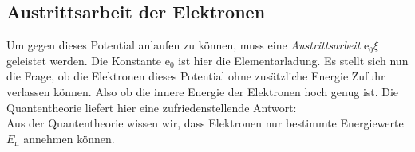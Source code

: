 \subsection{Austrittsarbeit der Elektronen}

Um gegen dieses Potential anlaufen zu können, muss eine
\textit{Austrittsarbeit} $\mathrm{e}_0 \xi$ geleistet
werden. Die Konstante $\mathrm{e}_0$ ist hier die
Elementarladung.
Es stellt sich nun die Frage, ob die Elektronen dieses
Potential ohne zusätzliche Energie Zufuhr verlassen können.
Also ob die innere Energie der Elektronen hoch genug ist.
Die Quantentheorie liefert hier eine zufriedenstellende 
Antwort:\\
Aus der Quantentheorie wissen wir, dass Elektronen 
nur bestimmte Energiewerte $E_{\mathrm{n}}$ annehmen können.

